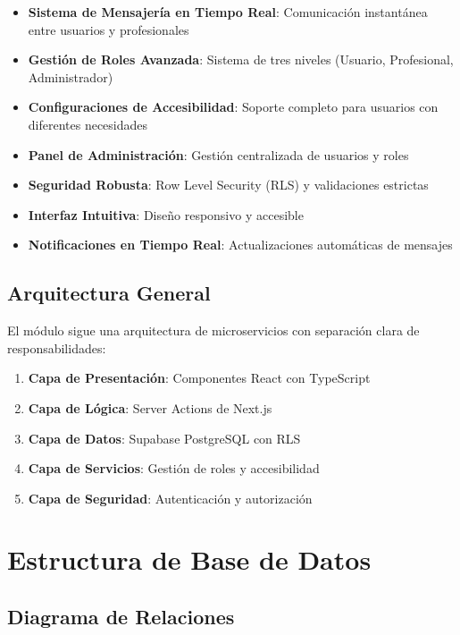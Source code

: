 \documentclass[12pt,a4paper]{article}
\begin{document}
\begin{itemize}
    \item \textbf{Sistema de Mensajería en Tiempo Real}: Comunicación instantánea entre usuarios y profesionales
    \item \textbf{Gestión de Roles Avanzada}: Sistema de tres niveles (Usuario, Profesional, Administrador)
    \item \textbf{Configuraciones de Accesibilidad}: Soporte completo para usuarios con diferentes necesidades
    \item \textbf{Panel de Administración}: Gestión centralizada de usuarios y roles
    \item \textbf{Seguridad Robusta}: Row Level Security (RLS) y validaciones estrictas
    \item \textbf{Interfaz Intuitiva}: Diseño responsivo y accesible
    \item \textbf{Notificaciones en Tiempo Real}: Actualizaciones automáticas de mensajes
\end{itemize}

\subsection{Arquitectura General}

El módulo sigue una arquitectura de microservicios con separación clara de responsabilidades:

\begin{enumerate}
    \item \textbf{Capa de Presentación}: Componentes React con TypeScript
    \item \textbf{Capa de Lógica}: Server Actions de Next.js
    \item \textbf{Capa de Datos}: Supabase PostgreSQL con RLS
    \item \textbf{Capa de Servicios}: Gestión de roles y accesibilidad
    \item \textbf{Capa de Seguridad}: Autenticación y autorización
\end{enumerate}

\section{Estructura de Base de Datos}

\subsection{Diagrama de Relaciones}
\end{document}
